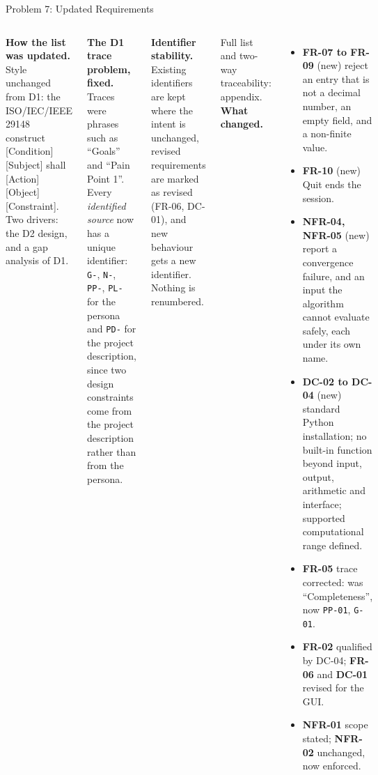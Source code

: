 \documentclass[11pt]{beamer}
\begin{document}
\begin{frame}{Problem 7: Updated Requirements}
  \scriptsize
  \begin{columns}[T]
      \textbf{How the list was updated.} Style unchanged from D1: the
      ISO/IEC/IEEE 29148 construct [Condition] [Subject] shall [Action]
      [Object] [Constraint]. Two drivers: the D2 design, and a gap analysis
      of D1.
      \smallskip

      \textbf{The D1 trace problem, fixed.} Traces were phrases such as
      ``Goals'' and ``Pain Point 1''. Every \emph{identified source} now has a
      unique identifier: \texttt{G-}, \texttt{N-}, \texttt{PP-},
      \texttt{PL-} for the persona and \texttt{PD-} for the project
      description, since two design constraints come from the project
      description rather than from the persona.
      \smallskip

      \textbf{Identifier stability.} Existing identifiers are kept where the
      intent is unchanged, revised requirements are marked as revised
      (FR-06, DC-01), and new behaviour gets a new identifier. Nothing is
      renumbered.
      \smallskip

      Full list and two-way traceability: appendix.
      \textbf{What changed.}
      \begin{itemize}
        \item \textbf{FR-07 to FR-09} (new) reject an entry that is not a
              decimal number, an empty field, and a non-finite value.
        \item \textbf{FR-10} (new) Quit ends the session.
        \item \textbf{NFR-04, NFR-05} (new) report a convergence failure, and
              an input the algorithm cannot evaluate safely, each under its
              own name.
        \item \textbf{DC-02 to DC-04} (new) standard Python installation; no
              built-in function beyond input, output, arithmetic and
              interface; supported computational range defined.
        \item \textbf{FR-05} trace corrected: was ``Completeness'', now
              \texttt{PP-01}, \texttt{G-01}.
        \item \textbf{FR-02} qualified by DC-04; \textbf{FR-06} and
              \textbf{DC-01} revised for the GUI.
        \item \textbf{NFR-01} scope stated; \textbf{NFR-02} unchanged, now
              enforced.
      \end{itemize}
  \end{columns}
\end{frame}
\end{document}
